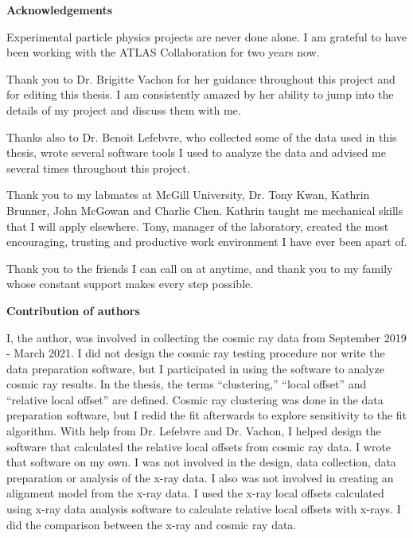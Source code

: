 \cleardoublepage


\begin{center}\textbf{Acknowledgements}\end{center}

Experimental particle physics projects are never done alone. I am grateful to have been working with the ATLAS Collaboration for two years now.

Thank you to Dr. Brigitte Vachon for her guidance throughout this project and for editing this thesis. I am consistently amazed by her ability to jump into the details of my project and discuss them with me. 

Thanks also to Dr. Benoit Lefebvre, who collected some of the data used in this thesis, wrote several software tools I used to analyze the data and advised me several times throughout this project. 

Thank you to my labmates at McGill University, Dr. Tony Kwan, Kathrin Brunner, John McGowan and Charlie Chen. Kathrin taught me mechanical skills that I will apply elsewhere. Tony, manager of the laboratory, created the most encouraging, trusting and productive work environment I have ever been apart of.

Thank you to the friends I can call on at anytime, and thank you to my family whose constant support makes every step possible.

\cleardoublepage

 \begin{center}\textbf{Contribution of authors}\end{center}
  
 \noindent

I, the author, was involved in collecting the cosmic ray data from September 2019 - March 2021. I did not design the cosmic ray testing procedure nor write the data preparation software, but I participated in using the software to analyze cosmic ray results. In the thesis, the terms ``clustering,'' ``local offset'' and ``relative local offset'' are defined. Cosmic ray clustering was done in the data preparation software, but I redid the fit afterwards to explore sensitivity to the fit algorithm. With help from Dr. Lefebvre and Dr. Vachon, I helped design the software that calculated the relative local offsets from cosmic ray data. I wrote that software on my own. I was not involved in the design, data collection, data preparation or analysis of the x-ray data. I also was not involved in creating an alignment model from the x-ray data. I used the x-ray local offsets calculated using x-ray data analysis software to calculate relative local offsets with x-rays. I did the comparison between the x-ray and cosmic ray data.

